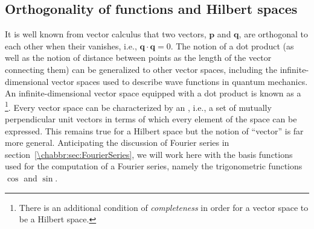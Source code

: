 \subsection{Orthogonality of functions and Hilbert spaces}\label{\chabbr:ssec:orthofunc}

It is well known from vector calculus that two vectors, $\mathbf{p}$ and $\mathbf{q}$, are orthogonal to each other when their  vanishes, i.e., $\mathbf{q}\cdot\mathbf{q}=0$.  The notion of a dot product (as well as the notion of distance between points as the length of the vector connecting them) can be generalized to other vector spaces, including the infinite-dimensional vector spaces used to describe wave functions in quantum mechanics.  An infinite-dimensional vector space equipped with a dot product is known as a \footnote{There is an additional condition of \textit{completeness} in order for a vector space to be a Hilbert space.}.  Every vector space can be characterized by an , i.e., a set of mutually perpendicular unit vectors in terms of which every element of the space can be expressed. This remains true for a Hilbert space but the notion of ``vector'' is far more general.  Anticipating the discussion of Fourier series in section~\ref{\chabbr:sec:FourierSeries}, we will work here with the basis functions used for the computation of a Fourier series, namely the trigonometric functions $\cos$ and $\sin$.


